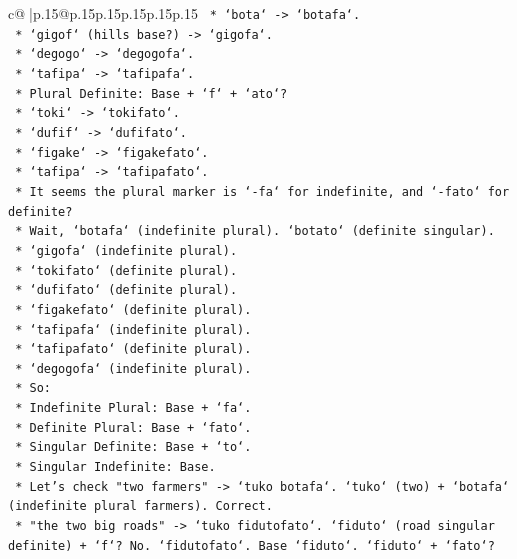 \documentclass{article}
\begin{document}
{\begin{supertabular}{c@{$\;$}|p{.15\linewidth}@{}p{.15\linewidth}p{.15\linewidth}p{.15\linewidth}p{.15\linewidth}p{.15\linewidth}}
{{{\texttt{                *   `bota` {-}> `botafa`.} \\
\texttt{                *   `gigof` (hills base?) {-}> `gigofa`.} \\
\texttt{                *   `degogo` {-}> `degogofa`.} \\
\texttt{                *   `tafipa` {-}> `tafipafa`.} \\
\texttt{            *   Plural Definite: Base + `f` + `ato`?} \\
\texttt{                *   `toki` {-}> `tokifato`.} \\
\texttt{                *   `dufif` {-}> `dufifato`.} \\
\texttt{                *   `figake` {-}> `figakefato`.} \\
\texttt{                *   `tafipa` {-}> `tafipafato`.} \\
\texttt{        *   It seems the plural marker is `{-}fa` for indefinite, and `{-}fato` for definite?} \\
\texttt{        *   Wait, `botafa` (indefinite plural). `botato` (definite singular).} \\
\texttt{        *   `gigofa` (indefinite plural).} \\
\texttt{        *   `tokifato` (definite plural).} \\
\texttt{        *   `dufifato` (definite plural).} \\
\texttt{        *   `figakefato` (definite plural).} \\
\texttt{        *   `tafipafa` (indefinite plural).} \\
\texttt{        *   `tafipafato` (definite plural).} \\
\texttt{        *   `degogofa` (indefinite plural).} \\
\texttt{        *   So:} \\
\texttt{            *   Indefinite Plural: Base + `fa`.} \\
\texttt{            *   Definite Plural: Base + `fato`.} \\
\texttt{            *   Singular Definite: Base + `to`.} \\
\texttt{            *   Singular Indefinite: Base.} \\
\texttt{        *   Let's check "two farmers" {-}> `tuko botafa`. `tuko` (two) + `botafa` (indefinite plural farmers). Correct.} \\
\texttt{        *   "the two big roads" {-}> `tuko fidutofato`. `fiduto` (road singular definite) + `f`? No. `fidutofato`. Base `fiduto`. `fiduto` + `fato`?} \\
}}}
\end{supertabular}}
\end{document}
